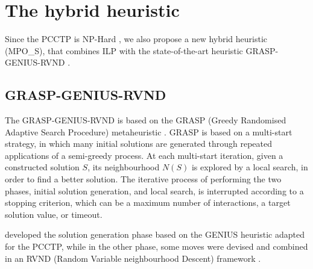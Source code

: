 \documentclass{singlecol-new}
\theoremstyle{TH}{
\newtheorem{lemma}{Lemma}
\newtheorem{theorem}[lemma]{Theorem}
\newtheorem{corrolary}[lemma]{Corrolary}
\newtheorem{conjecture}[lemma]{Conjecture}
\newtheorem{proposition}[lemma]{Proposition}
\newtheorem{claim}[lemma]{Claim}
\newtheorem{stheorem}[lemma]{Wrong Theorem}
}
\theoremstyle{THrm}{
\newtheorem{definition}{Definition}[section]
\newtheorem{question}{Question}[section]
\newtheorem{remark}{Remark}
\newtheorem{scheme}{Scheme}
}
\theoremstyle{THhit}{
\newtheorem{case}{Case}[section]
}
\begin{document}


\section{The hybrid heuristic }
\label{sec:heristics}

Since the PCCTP is NP-Hard \citep{lyra2004problema}, we also propose a  new hybrid heuristic (MPO\_S), that combines ILP  with the state-of-the-art heuristic GRASP-GENIUS-RVND \citep{daSilva}.


\subsection{GRASP-GENIUS-RVND}
The GRASP-GENIUS-RVND \citep{daSilva} is based on the GRASP (Greedy Randomised Adaptive Search Procedure) metaheuristic \citep{grasp03}. GRASP is based on a multi-start strategy, in which many initial solutions are generated through repeated applications of a semi-greedy process. At each multi-start iteration, given a constructed solution $S$, its neighbourhood $N(S)$ is explored by a local search, in order to find a better solution. The iterative process of performing the two phases, initial solution generation, and local search, is interrupted according to a stopping criterion, which can be a maximum number of interactions, a target solution value, or timeout.




\citet{daSilva} developed the solution generation phase based on the GENIUS heuristic \citep{genius} adapted for the PCCTP, while in the other phase, some moves were devised and combined in an RVND (Random Variable neighbourhood Descent) framework \citep{mladenovic97}.
\end{document}
